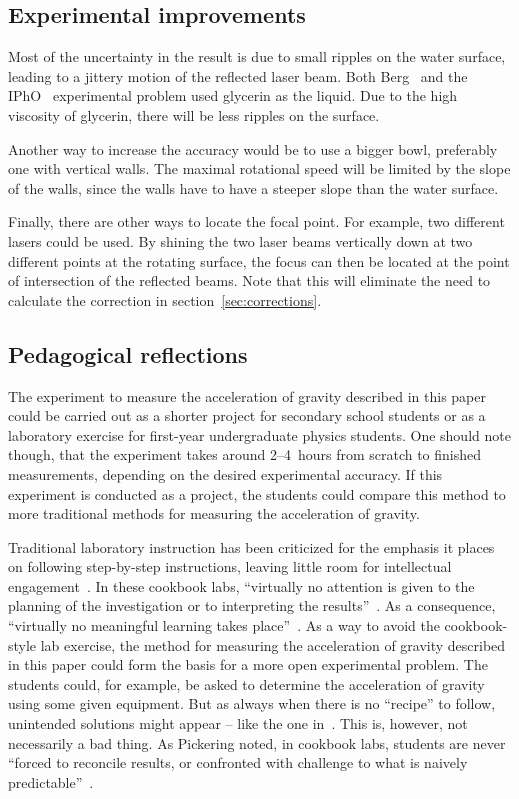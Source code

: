 \documentclass[11pt, a4paper, twocolumn, swedish, english]{article}
\begin{document}
\subsection{Experimental improvements}

Most of the uncertainty in the result is due to small ripples on the
water surface, leading to a jittery motion of the reflected
laser beam. Both Berg~\cite{Berg1990} and the IPhO~\cite{IPhO2001} experimental problem used
glycerin as the liquid. Due to the high viscosity
of glycerin, there will be less ripples on the surface.

Another way to increase the accuracy would be to use a bigger bowl,
preferably one with vertical walls. The maximal rotational
speed will be limited by the slope of the walls, since the walls have
to have a steeper slope than the water surface.

Finally, there are other ways to locate the focal point. For example, two
different lasers could be used. By shining the two laser beams
vertically down at two different points at the rotating surface, the
focus can then be located at the point of intersection of the reflected
beams. Note that this will eliminate the need to calculate the correction in
section~\ref{sec:corrections}. 

\subsection{Pedagogical reflections}

The experiment to measure the acceleration of gravity described in
this paper could be carried out as a shorter project for secondary
school students or as a laboratory exercise for first-year
undergraduate physics students. One should note though, that the
experiment takes around 2--4~hours from scratch to finished
measurements, depending on the desired experimental accuracy. If this
experiment is conducted as a project, the students could compare this
method to more traditional methods for measuring the acceleration of
gravity.

Traditional laboratory instruction has been criticized for the
emphasis it places on following step-by-step instructions, leaving
little room for intellectual engagement~\cite{Domin1999}. In these
cookbook labs, ``virtually no attention is given to the planning of
the investigation or to interpreting the
results''~\cite{Domin1999}. As a consequence, ``virtually no
meaningful learning takes place''~\cite{Domin1999}. As a way to avoid
the cookbook-style lab exercise, the method for measuring the
acceleration of gravity described in this paper could form the basis
for a more open experimental problem. The students could, for example,
be asked to determine the acceleration of gravity using some given
equipment. But as always when there is no ``recipe'' to follow,
unintended solutions might appear – like the one
in~\cite{IPhO2001}. This is, however, not necessarily a bad thing. As
Pickering noted, in cookbook labs, students are never ``forced to
reconcile results, or confronted with challenge to what is naively
predictable''~\cite{Pickering1987}.
\end{document}
